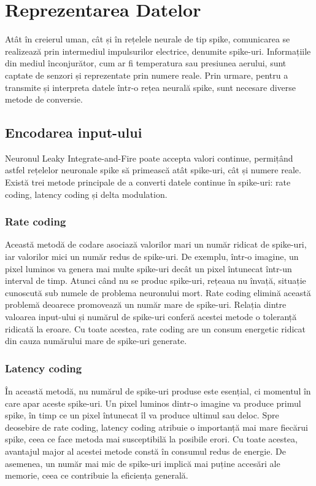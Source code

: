 \section{Reprezentarea Datelor}

Atât în creierul uman, cât și în rețelele neurale de tip spike, comunicarea se realizează prin intermediul impulsurilor electrice, denumite spike-uri. Informațiile din mediul înconjurător, cum ar fi temperatura sau presiunea aerului, sunt captate de senzori și reprezentate prin numere reale. Prin urmare, pentru a transmite și interpreta datele într-o rețea neurală spike, sunt necesare diverse metode de conversie.

\subsection{Encodarea input-ului}

Neuronul Leaky Integrate-and-Fire poate accepta valori continue, permițând astfel rețelelor neuronale spike să primească atât spike-uri, cât și numere reale. Există trei metode principale de a converti datele continue în spike-uri: rate coding, latency coding și delta modulation.


\subsubsection{Rate coding}

Această metodă de codare asociază valorilor mari un număr ridicat de spike-uri, iar valorilor mici un număr redus de spike-uri. De exemplu, într-o imagine, un pixel luminos va genera mai multe spike-uri decât un pixel întunecat într-un interval de timp. Atunci când nu se produc spike-uri, rețeaua nu învață, situație cunoscută sub numele de problema neuronului mort. Rate coding elimină această problemă deoarece promovează un număr mare de spike-uri. Relația dintre valoarea input-ului și numărul de spike-uri conferă acestei metode o toleranță ridicată la eroare. Cu toate acestea, rate coding are un consum energetic ridicat din cauza numărului mare de spike-uri generate.


\subsubsection{Latency coding}

În această metodă, nu numărul de spike-uri produse este esențial, ci momentul în care apar aceste spike-uri. Un pixel luminos dintr-o imagine va produce primul spike, în timp ce un pixel întunecat îl va produce ultimul sau deloc. Spre deosebire de rate coding, latency coding atribuie o importanță mai mare fiecărui spike, ceea ce face metoda mai susceptibilă la posibile erori. Cu toate acestea, avantajul major al acestei metode constă în consumul redus de energie. De asemenea, un număr mai mic de spike-uri implică mai puține accesări ale memorie, ceea ce contribuie la eficiența generală.


